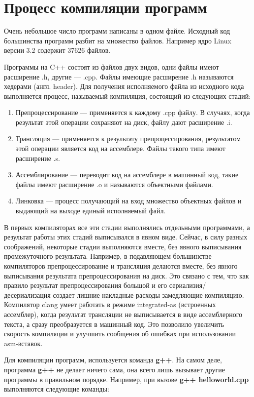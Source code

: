 \section{Процесс компиляции программ}
Очень небольшое число программ написаны в одном файле. Исходный код большинства программ разбит на множество файлов. Например ядро Linux версии 3.2 содержит 37626 файлов.

Программы на C++ состоят из файлов двух видов, одни файлы имеют расширение .h, другие --- .cpp. Файлы имеющие расширение .h называются хедерами (англ. header). Для получения исполняемого файла из исходного кода выполняется процесс, называемый компиляция, состоящий из следующих стадий:

\begin{enumerate}
\item Препроцессирование --- применяется к каждому .cpp файлу. В случаях, когда результат этой операции сохраняют на диск, файлу дают расширение .i.
\item Трансляция --- применяется к результату препроцессирования, результатом этой операции является код на ассемблере. Файлы такого типа имеют расширение .s.
\item Ассемблирование --- переводит код на ассемблере в машинный код, такие файлы имеют расширение .o и называются объектными файлами.
\item Линковка --- процесс получающий на вход множество объектных файлов и выдающий на выходе единый исполняемый файл.
\end{enumerate}

В первых компиляторах все эти стадии выполнялись отдельными программами, а результат работы этих стадий выписывался в явном виде. Сейчас, в силу разных соображений, некоторые стадии выполняются вместе, без явного выписывания промежуточного результата. Например, в подавляющем большинстве компиляторов препроцессирование и трансляция делаются вместе, без явного выписывания результата препроцессирования на диск. Это связано с тем, что как правило результат препроцессирования большой и его сериализия/десериализация создает лишние накладные расходы замедляющие компиляцию. Компилятор clang умеет работать в режиме integrated-as (встроенных ассемблер), когда результат трансляции не выписывается в виде ассемблерного текста, а сразу преобразуется в машинный код. Это позволило увеличить скорость компиляции и улучшить сообщения об ошибках при использовании asm-вставок.

Для компиляции программ, используется команда {\bf g++}. На самом деле, программа {\bf g++} не делает ничего сама, она всего лишь вызывает другие программы в правильном порядке. Например, при вызове {\bf g++ helloworld.cpp} выполняются следующие команды:

